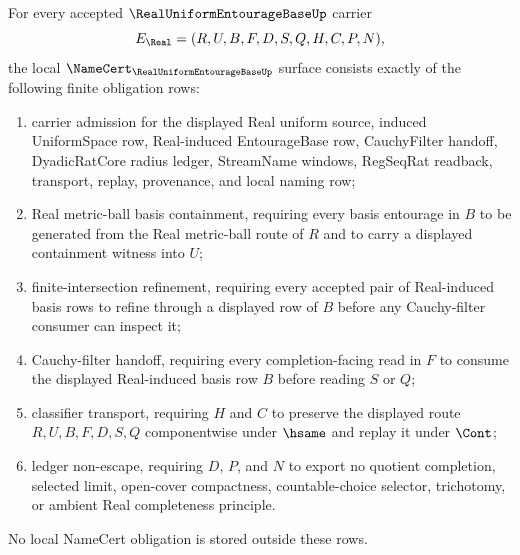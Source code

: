 \begin{theorem}
\label{thm:real-uniform-entourage-base-namecert-obligations}
For every accepted $\RealUniformEntourageBaseUp$ carrier
$$
E_{\Real}=(R,U,B,F,D,S,Q,H,C,P,N),
$$
the local $\NameCert_{\RealUniformEntourageBaseUp}$ surface consists exactly of the following finite obligation rows:
\begin{enumerate}
\item carrier admission for the displayed Real uniform source, induced UniformSpace row, Real-induced EntourageBase row, CauchyFilter handoff, DyadicRatCore radius ledger, StreamName windows, RegSeqRat readback, transport, replay, provenance, and local naming row;
\item Real metric-ball basis containment, requiring every basis entourage in $B$ to be generated from the Real metric-ball route of $R$ and to carry a displayed containment witness into $U$;
\item finite-intersection refinement, requiring every accepted pair of Real-induced basis rows to refine through a displayed row of $B$ before any Cauchy-filter consumer can inspect it;
\item Cauchy-filter handoff, requiring every completion-facing read in $F$ to consume the displayed Real-induced basis row $B$ before reading $S$ or $Q$;
\item classifier transport, requiring $H$ and $C$ to preserve the displayed route $R,U,B,F,D,S,Q$ componentwise under $\hsame$ and replay it under $\Cont$;
\item ledger non-escape, requiring $D$, $P$, and $N$ to export no quotient completion, selected limit, open-cover compactness, countable-choice selector, trichotomy, or ambient Real completeness principle.
\end{enumerate}
No local NameCert obligation is stored outside these rows.
\end{theorem}
